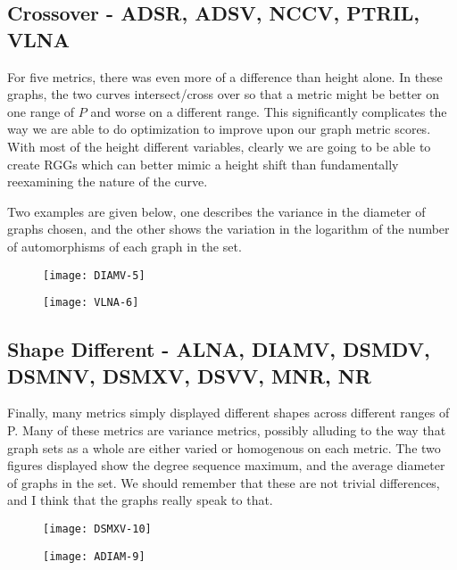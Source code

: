 \subsection*{Crossover - ADSR, ADSV, NCCV, PTRIL, VLNA}

For five metrics, there was even more of a difference than height alone.
In these graphs, the two curves intersect/cross over so that a metric might be better on one range of $P$ and worse on a different range.
This significantly complicates the way we are able to do optimization to improve upon our graph metric scores. 
With most of the height different variables, clearly we are going to be able to create RGGs which can better mimic a height shift than fundamentally reexamining the nature of the curve.

Two examples are given below, one describes the variance in the diameter of graphs chosen, and the other shows the variation in the logarithm of the number of automorphisms of each graph in the set.

\begin{figure}[h]
\label{fig:diamv5}
\caption{}
\centering
\texttt{[image: DIAMV-5]}
\end{figure}

\begin{figure}[h]
\label{fig:vlna6}
\caption{}
\centering
\texttt{[image: VLNA-6]}
\end{figure}

\subsection*{Shape Different - ALNA, DIAMV, DSMDV, DSMNV, DSMXV, DSVV, MNR, NR}
Finally, many metrics simply displayed different shapes across different ranges of P.
Many of these metrics are variance metrics, possibly alluding to the way that graph sets as a whole are either varied or homogenous on each metric.
The two figures displayed show the degree sequence maximum, and the average diameter of graphs in the set.
We should remember that these are not trivial differences, and I think that the graphs really speak to that.

\begin{figure}[h]
\label{fig:dsmxv10}
\caption{}
\centering
\texttt{[image: DSMXV-10]}
\end{figure}

\begin{figure}[h]
\label{fig:adiam9}
\caption{}
\centering
\texttt{[image: ADIAM-9]}
\end{figure}


